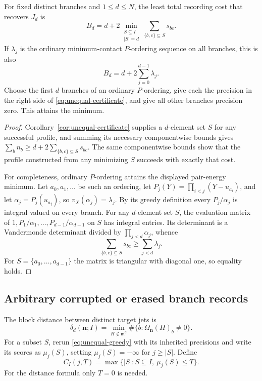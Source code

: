 \begin{theorem}
\label{thm:unequal-budget}
For fixed distinct branches and $1\le d\le N$, the least total recording
cost that recovers $J_d$ is
\begin{equation}
 B_d=d+2\min_{\substack{S\subseteq I\\|S|=d}}
                    \sum_{\{b,c\}\subseteq S}s_{bc}.
 \label{eq:unequal-budget}
\end{equation}
If $\lambda_j$ is the ordinary minimum-contact $P$-ordering sequence on all
branches, this is also
\[
 B_d=d+2\sum_{j=0}^{d-1}\lambda_j.
\]
Choose the first $d$ branches of an ordinary $P$-ordering, give each the
precision in the right side of \eqref{eq:unequal-certificate}, and give all
other branches precision zero.  This attains the minimum.
\end{theorem}

\begin{proof}
Corollary~\ref{cor:unequal-certificate} supplies a $d$-element set $S$ for
any successful profile, and summing its necessary componentwise bounds gives
$\sum_b n_b\ge d+2\sum_{\{b,c\}\subseteq S}s_{bc}$.
The same componentwise bounds show that the profile constructed from any
minimizing $S$ succeeds with exactly that cost.

For completeness, ordinary $P$-ordering attains the displayed pair-energy
minimum.  Let $a_0,a_1,\ldots$ be such an ordering, let
$P_j(Y)=\prod_{i<j}(Y-u_{a_i})$, and let $\alpha_j=P_j(u_{a_j})$, so
$v_X(\alpha_j)=\lambda_j$.  By its greedy definition every
$P_j/\alpha_j$ is integral valued on every branch.  For any $d$-element set
$S$, the evaluation matrix of $1,P_1/\alpha_1,\ldots,P_{d-1}/\alpha_{d-1}$
on $S$ has integral entries.  Its determinant is a Vandermonde determinant
divided by $\prod_{j<d}\alpha_j$, whence
\[
 \sum_{\{b,c\}\subseteq S}s_{bc}\ge\sum_{j<d}\lambda_j.
\]
For $S=\{a_0,\ldots,a_{d-1}\}$ the matrix is triangular with diagonal one,
so equality holds.
\end{proof}

\subsection{Arbitrary corrupted or erased branch records}

The block distance between distinct target jets is
\[
 \delta_d(\boldsymbol n;I)
   =\min_{H\notin\mathfrak m^d}
          \#\{b:\Omega_{\boldsymbol n}(H)_b\ne0\}.
\]
For a subset $S$, rerun \eqref{eq:unequal-greedy} with its inherited
precisions and write its scores as $\mu_j(S)$, setting
$\mu_j(S)=-\infty$ for $j\ge|S|$.  Define
\[
 C_I(j,T)=\max\{|S|:S\subseteq I,\ \mu_j(S)\le T\}.
\]
For the distance formula only $T=0$ is needed.

